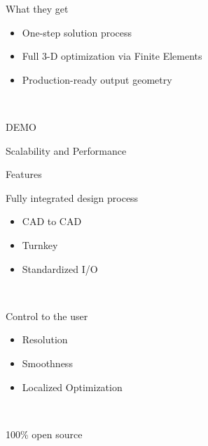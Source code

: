 \begin{frame}{What they get}	
\begin{itemize}
			\item One-step solution process	
			\item Full 3-D optimization via Finite Elements
			\item Production-ready output geometry
			\end{itemize}~\\
\end{frame}	

\begin{frame}{DEMO}

\end{frame}

\begin{frame}{Scalability and Performance}

\end{frame}

\begin{frame}{Features}

\begin{block}{Fully integrated design process}{
		\begin{itemize}		
			\item CAD to CAD
			\item Turnkey
			\item Standardized I/O			
		\end{itemize}~\\
		}
		\end{block}
\pause
\begin{block}{Control to the user}{
		\begin{itemize}		
			\item Resolution
			\item Smoothness
			\item Localized Optimization			
		\end{itemize}~\\
		}
		\end{block}
\pause		
\begin{block}{100\% open source}{
		}
		\end{block}

\end{frame}
		